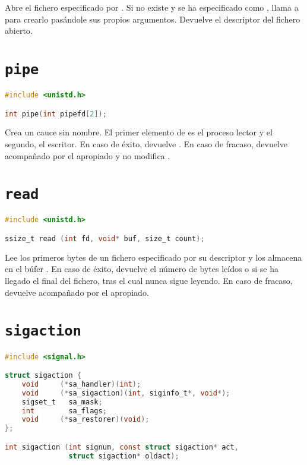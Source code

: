 Abre el fichero especificado por .
Si no existe y se ha especificado  como , llama a  para crearlo pasándole sus propios argumentos.
Devuelve el descriptor del fichero abierto.

\section{\texttt{pipe}}\label{pipe}

\begin{lstlisting}[language=C]
#include <unistd.h>

int pipe(int pipefd[2]);
\end{lstlisting}

Crea un cauce sin nombre.
El primer elemento de  es el proceso lector y el segundo, el escritor.
En caso de éxito, devuelve .
En caso de fracaso, devuelve  acompañado por el  apropiado y no modifica .

\pagebreak

\section{\texttt{read}}\label{read}

\begin{lstlisting}[language=C]
#include <unistd.h>

ssize_t read (int fd, void* buf, size_t count);
\end{lstlisting}

Lee los  primeros bytes de un fichero especificado por su descriptor  y los almacena en el búfer .
En caso de éxito, devuelve el número de bytes leídos o  si se ha llegado el final del fichero, tras el cual nunca sigue leyendo.
En caso de fracaso, devuelve  acompañado por el  apropiado.

\section{\texttt{sigaction}}\label{sigaction}

\begin{lstlisting}[language=C]
#include <signal.h>

struct sigaction {
	void     (*sa_handler)(int);
	void     (*sa_sigaction)(int, siginfo_t*, void*);
	sigset_t   sa_mask;
	int        sa_flags;
	void     (*sa_restorer)(void);
};

int sigaction (int signum, const struct sigaction* act,
               struct sigaction* oldact);
\end{lstlisting}

